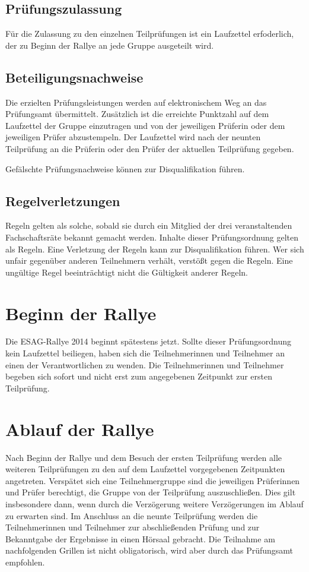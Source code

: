 \documentclass[a4paper,10pt]{article}
\begin{document}
\subsection{Prüfungszulassung}

Für die Zulassung zu den einzelnen Teilprüfungen ist ein Laufzettel erfoderlich, 
der zu Beginn der Rallye an jede Gruppe ausgeteilt wird.

\subsection{Beteiligungsnachweise}


Die erzielten Prüfungsleistungen werden auf elektronischem Weg an das
Prüfungsamt übermittelt. Zusätzlich ist die erreichte Punktzahl auf dem 
Laufzettel der Gruppe einzutragen und von der jeweiligen Prüferin oder dem
jeweiligen Prüfer abzustempeln. 
Der Laufzettel wird nach der neunten Teilprüfung an die Prüferin oder den Prüfer 
der aktuellen Teilprüfung gegeben.

Gefälschte Prüfungsnachweise können zur Disqualifikation führen.

\subsection{Regelverletzungen}

Regeln gelten als solche, sobald sie durch ein Mitglied der drei 
veranstaltenden Fachschaftsräte bekannt gemacht werden. Inhalte dieser
Prüfungsordnung gelten als Regeln. Eine Verletzung der Regeln kann zur
Disqualifikation führen. Wer sich unfair gegenüber anderen Teilnehmern
verhält, verstößt gegen die Regeln. Eine ungültige Regel beeinträchtigt
nicht die Gültigkeit anderer Regeln.



\section{Beginn der Rallye}

Die ESAG-Rallye 2014 beginnt spätestens jetzt. Sollte dieser Prüfungsordnung
kein Laufzettel beiliegen, haben sich die Teilnehmerinnen und Teilnehmer an 
einen der Verantwortlichen zu wenden. Die Teilnehmerinnen und Teilnehmer
begeben sich sofort und nicht erst zum angegebenen Zeitpunkt zur ersten
Teilprüfung.

\section{Ablauf der Rallye}
Nach Beginn der Rallye und dem Besuch der ersten Teilprüfung werden alle 
weiteren Teilprüfungen zu den auf dem Laufzettel vorgegebenen Zeitpunkten 
angetreten. Verspätet sich eine Teilnehmergruppe sind die jeweiligen Prüferinnen
und Prüfer berechtigt, die Gruppe von der Teilprüfung auszuschließen. Dies 
gilt insbesondere dann, wenn durch die Verzögerung weitere Verzögerungen im 
Ablauf zu erwarten sind. Im Anschluss an die neunte Teilprüfung werden die 
Teilnehmerinnen und Teilnehmer zur abschließenden Prüfung und zur Bekanntgabe 
der Ergebnisse in einen Hörsaal gebracht. Die Teilnahme am nachfolgenden 
Grillen ist nicht obligatorisch, wird aber durch das Prüfungsamt empfohlen.
\end{document}
